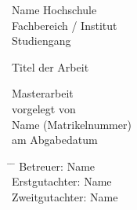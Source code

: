 \begin{titlepage}
    \begin{center}
        \Large
        Name Hochschule\\
        Fachbereich / Institut\\
        Studiengang\\
        \vspace{0.5cm} 
        
        \Huge
        Titel der Arbeit
        \vfill
        
        \LARGE
        Masterarbeit \\
            
        \vspace{0.8cm}
        vorgelegt von \\
        Name (Matrikelnummer)\\
        am Abgabedatum\\
    \end{center}

    \Large
    \vspace{1.75cm}
    \begin{tabbing}
    \hspace*{0.5cm}\= \hspace*{6cm} \= \kill
        \>Betreuer:\> Name\\
        \>Erstgutachter:\> Name \\
        \>Zweitgutachter:\> Name
    \end{tabbing}
\end{titlepage}
